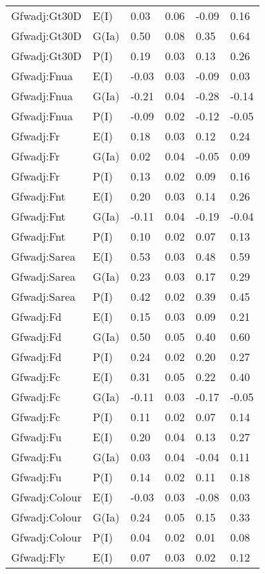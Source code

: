\begin{center}
\begin{longtable}{|p{1.1in}|p{0.7in}|p{0.7in}|p{0.6in}|p{0.6in}|p{0.6in}|}
  Gfwadj:Gt30D & E(I) & 0.03 & 0.06 & -0.09 & 0.16 \\ 
  Gfwadj:Gt30D & G(Ia) & 0.50 & 0.08 & 0.35 & 0.64 \\ 
  Gfwadj:Gt30D & P(I) & 0.19 & 0.03 & 0.13 & 0.26 \\ 
  Gfwadj:Fnua & E(I) & -0.03 & 0.03 & -0.09 & 0.03 \\ 
  Gfwadj:Fnua & G(Ia) & -0.21 & 0.04 & -0.28 & -0.14 \\ 
  Gfwadj:Fnua & P(I) & -0.09 & 0.02 & -0.12 & -0.05 \\ 
  Gfwadj:Fr & E(I) & 0.18 & 0.03 & 0.12 & 0.24 \\ 
  Gfwadj:Fr & G(Ia) & 0.02 & 0.04 & -0.05 & 0.09 \\ 
  Gfwadj:Fr & P(I) & 0.13 & 0.02 & 0.09 & 0.16 \\ 
  Gfwadj:Fnt & E(I) & 0.20 & 0.03 & 0.14 & 0.26 \\ 
  Gfwadj:Fnt & G(Ia) & -0.11 & 0.04 & -0.19 & -0.04 \\ 
  Gfwadj:Fnt & P(I) & 0.10 & 0.02 & 0.07 & 0.13 \\ 
  Gfwadj:Sarea & E(I) & 0.53 & 0.03 & 0.48 & 0.59 \\ 
  Gfwadj:Sarea & G(Ia) & 0.23 & 0.03 & 0.17 & 0.29 \\ 
  Gfwadj:Sarea & P(I) & 0.42 & 0.02 & 0.39 & 0.45 \\ 
  Gfwadj:Fd & E(I) & 0.15 & 0.03 & 0.09 & 0.21 \\ 
  Gfwadj:Fd & G(Ia) & 0.50 & 0.05 & 0.40 & 0.60 \\ 
  Gfwadj:Fd & P(I) & 0.24 & 0.02 & 0.20 & 0.27 \\ 
  Gfwadj:Fc & E(I) & 0.31 & 0.05 & 0.22 & 0.40 \\ 
  Gfwadj:Fc & G(Ia) & -0.11 & 0.03 & -0.17 & -0.05 \\ 
  Gfwadj:Fc & P(I) & 0.11 & 0.02 & 0.07 & 0.14 \\ 
  Gfwadj:Fu & E(I) & 0.20 & 0.04 & 0.13 & 0.27 \\ 
  Gfwadj:Fu & G(Ia) & 0.03 & 0.04 & -0.04 & 0.11 \\ 
  Gfwadj:Fu & P(I) & 0.14 & 0.02 & 0.11 & 0.18 \\ 
  Gfwadj:Colour & E(I) & -0.03 & 0.03 & -0.08 & 0.03 \\ 
  Gfwadj:Colour & G(Ia) & 0.24 & 0.05 & 0.15 & 0.33 \\ 
  Gfwadj:Colour & P(I) & 0.04 & 0.02 & 0.01 & 0.08 \\ 
  Gfwadj:Fly & E(I) & 0.07 & 0.03 & 0.02 & 0.12 \\ 

\end{longtable}
\end{center}
